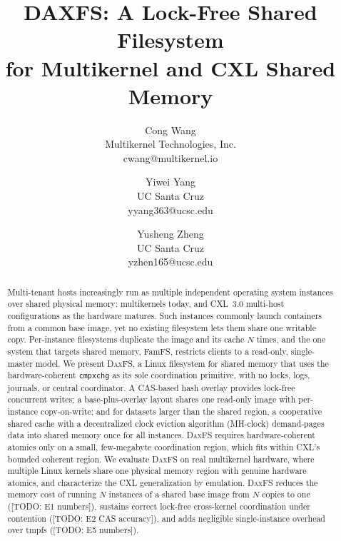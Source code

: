 \documentclass[letterpaper,twocolumn,10pt]{article}
\newcommand{\daxfs}{\textsc{DaxFS}\xspace}
\newcommand{\todo}[1]{[TODO: #1]}
\begin{document}

\date{}

\title{\Large \bf DAXFS: A Lock-Free Shared Filesystem\\
  for Multikernel and CXL Shared Memory}

\author{
{\rm Cong Wang}\\
Multikernel Technologies, Inc.\\
cwang@multikernel.io
\and
{\rm Yiwei Yang}\\
UC Santa Cruz\\
yyang363@ucsc.edu
\and
{\rm Yusheng Zheng}\\
UC Santa Cruz\\
yzhen165@ucsc.edu
} %

\maketitle

\begin{abstract}
Multi-tenant hosts increasingly run as multiple independent operating
system instances over shared physical memory: multikernels today, and
CXL~3.0 multi-host configurations as the hardware matures.  Such
instances commonly launch containers from a common base image, yet no
existing filesystem lets them share one writable copy.  Per-instance
filesystems duplicate the image and its cache $N$ times, and the one
system that targets shared memory, FamFS, restricts clients to a
read-only, single-master model.
We present \daxfs, a Linux filesystem for shared memory that uses the
hardware-coherent \texttt{cmpxchg} as its sole coordination primitive,
with no locks, logs, journals, or central coordinator.  A CAS-based
hash overlay provides lock-free concurrent writes; a base-plus-overlay
layout shares one read-only image with per-instance copy-on-write; and
for datasets larger than the shared region, a cooperative shared cache
with a decentralized clock eviction algorithm (MH-clock) demand-pages
data into shared memory once for all instances.  \daxfs requires
hardware-coherent atomics only on a small, few-megabyte coordination
region, which fits within CXL's bounded coherent region.
We evaluate \daxfs on real multikernel hardware, where multiple Linux
kernels share one physical memory region with genuine hardware atomics,
and characterize the CXL generalization by emulation.  \daxfs reduces
the memory cost of running $N$ instances of a shared base image from
$N$ copies to one (\todo{E1 numbers}), sustains correct lock-free
cross-kernel coordination under contention (\todo{E2 CAS accuracy}),
and adds negligible single-instance overhead over tmpfs
(\todo{E5 numbers}).

\end{abstract}
\end{document}
